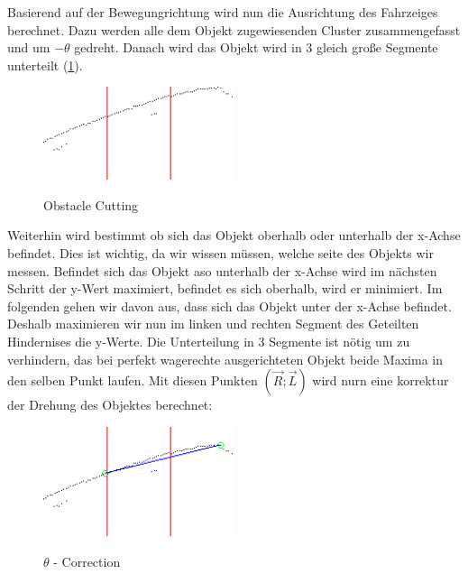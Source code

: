 \documentclass[11pt,oneside,openright]{mpreport}
\begin{document}
Basierend auf der Bewegungrichtung wird nun die Ausrichtung des Fahrzeiges berechnet. Dazu werden alle dem Objekt zugewiesenden Cluster zusammengefasst und um $-\theta$ gedreht.
Danach wird das Objekt wird in 3 gleich große Segmente unterteilt (\cref{obst_devide}).

\begin{figure}[!ht]
\caption{Obstacle Cutting}
\includegraphics[width=0.5\textwidth]{bilder/obst_devide.png}
\label{obst_devide}
\end{figure}

Weiterhin wird bestimmt ob sich das Objekt oberhalb oder unterhalb der x-Achse befindet. Dies ist wichtig, da wir wissen müssen, welche seite des Objekts wir messen.
Befindet sich das Objekt aso unterhalb der x-Achse wird im nächsten Schritt der y-Wert maximiert, befindet es sich oberhalb, wird er minimiert.
Im folgenden gehen wir davon aus, dass sich das Objekt unter der x-Achse befindet. Deshalb maximieren wir nun im linken und rechten Segment des Geteilten
Hindernises die y-Werte. Die Unterteilung in 3 Segmente ist nötig um zu verhindern, das bei perfekt wagerechte ausgerichteten Objekt beide Maxima in den selben Punkt laufen.
Mit diesen Punkten $(\vec{R};\vec{L})$ wird nurn eine korrektur der Drehung des Objektes berechnet:

\begin{figure}[!ht]
\caption{$\theta$ - Correction}
\includegraphics[width=0.5\textwidth]{bilder/obst_devide_angle.png}
\label{obst_correction}
\end{figure}
\end{document}
